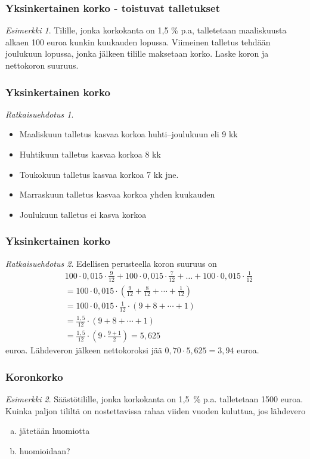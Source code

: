\documentclass[]{beamer}\usepackage[]{graphicx}\usepackage[]{color}
\theoremstyle{remark}
\newtheorem{esim}{Esimerkki}
\newtheorem{ratkaisu}{Ratkaisuehdotus}
\begin{document}
\begin{frame}
    \frametitle{Yksinkertainen korko - toistuvat talletukset}
    \begin{esim}
        Tilille, jonka korkokanta on 1,5 \% p.a, talletetaan maaliskuusta alkaen 100 euroa kunkin kuukauden lopussa.
        Viimeinen talletus tehdään joulukuun lopussa, jonka jälkeen tilille maksetaan korko. Laske koron ja nettokoron suuruus.
    \end{esim}
\end{frame}

\begin{frame}
    \frametitle{Yksinkertainen korko}
	\begin{ratkaisu}
		\begin{itemize}
			\item Maaliskuun talletus kasvaa korkoa huhti--joulukuun eli 9 kk
			\item Huhtikuun talletus kasvaa korkoa 8 kk
			\item Toukokuun talletus kasvaa korkoa 7 kk jne.
			\item Marraskuun talletus kasvaa korkoa yhden kuukauden
			\item Joulukuun talletus ei kasva korkoa
		\end{itemize}
	\end{ratkaisu}
\end{frame}

\begin{frame}
\frametitle{Yksinkertainen korko}
	\begin{ratkaisu}		
		Edellisen perusteella koron suuruus on\pause 
		\begin{align*}
			&100\cdot0,015\cdot\frac{9}{12}+100\cdot0,015\cdot\frac{7}{12}+\ldots+100\cdot0,015\cdot\frac{1}{12} \\
			&= 100\cdot0,015\cdot\left(\frac{9}{12} + \frac{8}{12} + \cdots +\frac{1}{12}\right)\\
			&= 100\cdot0,015\cdot\frac{1}{12}\cdot(9+8+\cdots+1)\\
			&= \frac{1,5}{12}\cdot(9+8+\cdots+1)\\
			&= \frac{1,5}{12}\cdot\left( 9\cdot\frac{9+1}{2}\right) = 5,625
		\end{align*}
		euroa. \pause Lähdeveron jälkeen nettokoroksi jää \(0,70\cdot5,625=3,94\) euroa.
	\end{ratkaisu}
\end{frame}

\begin{frame}
\frametitle{Koronkorko}
	\begin{esim}
		Säästötilille, jonka korkokanta on 1,5~\% p.a. talletetaan 1500 euroa.
		Kuinka paljon tililtä on nostettavissa rahaa viiden vuoden kuluttua, jos lähdevero
		\begin{enumerate}[(a)]
			\item jätetään huomiotta
			\item huomioidaan?
		\end{enumerate}
	\end{esim}
\end{frame}
\end{document}
